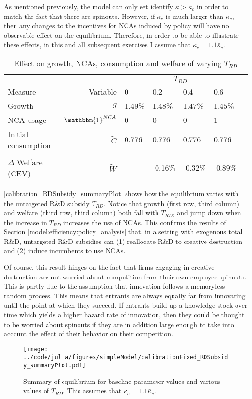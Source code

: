 \documentclass[11pt,english]{article}
\begin{document}
As mentioned previously, the model can only set identify $\kappa > \bar{\kappa}_c$ in order to match the fact that there are spinouts. However, if $\kappa_c$ is much larger than $\bar{\kappa}_c$, then any changes to the incentives for NCAs induced by policy will have no observable effect on the equilibrium. Therefore, in order to be able to illustrate these effects, in this and all subsequent exercises I assume that $\kappa_c = 1.1 \bar{\kappa}_c$. 

\begin{table}
	\centering
	\caption{Effect on growth, NCAs, consumption and welfare of varying $T_{RD}$}
	\begin{tabular}{lrlllll}
		\toprule \toprule
		&  & \multicolumn{4}{c}{$T_{RD}$} \tabularnewline
		Measure &Variable & 0 & 0.2 & 0.4 & 0.6 \tabularnewline
		\midrule
		Growth & $g$ & 1.49\% & 1.48\% & 1.47\% & 1.45\% \tabularnewline
		NCA usage & $\mathbbm{1}^{NCA}$ & 0 & 0 & 0 & 1 \tabularnewline
		Initial consumption & $\tilde{C}$  & 0.776 &  0.776 & 0.776 & 0.776 \tabularnewline 
		\tabularnewline
		$\Delta$ Welfare (CEV) & $\tilde{W}$  &  & -0.16\% & -0.32\% & -0.89\% \tabularnewline
		\bottomrule
	\end{tabular}
\end{table}

\autoref{calibration_RDSubsidy_summaryPlot} shows how the equilibrium varies with the untargeted R\&D subsidy $T_{RD}$. Notice that growth (first row, third column) and welfare (third row, third column) both fall with $T_{RD}$, and jump down when the increase in $T_{RD}$ increases the use of NCAs. This confirms the results of Section \ref{model:efficiency:policy_analysis} that, in a setting with exogenous total R\&D, untargeted R\&D subsidies can (1) reallocate R\&D to creative destruction and (2) induce incumbents to use NCAs.

Of course, this result hinges on the fact that firms engaging in creative destruction are not worried about competition from their own employee spinouts. This is partly due to the assumption that innovation follows a memoryless random process. This means that entrants are always equally far from innovating until the point at which they succeed. If entrants build up a knowledge stock over time which yields a higher hazard rate of innovation, then they could be thought to be worried about spinouts if they are in addition large enough to take into account the effect of their behavior on their competition. 

\begin{figure}[]
	\texttt{[image: ../code/julia/figures/simpleModel/calibrationFixed\_RDSubsidy\_summaryPlot.pdf]}
	\caption{Summary of equilibrium for baseline parameter values and various values of $T_{RD}$. This assumes that $\kappa_c = 1.1 \bar{\kappa}_c$.}
	\label{calibration_RDSubsidy_summaryPlot}
\end{figure}
\end{document}
